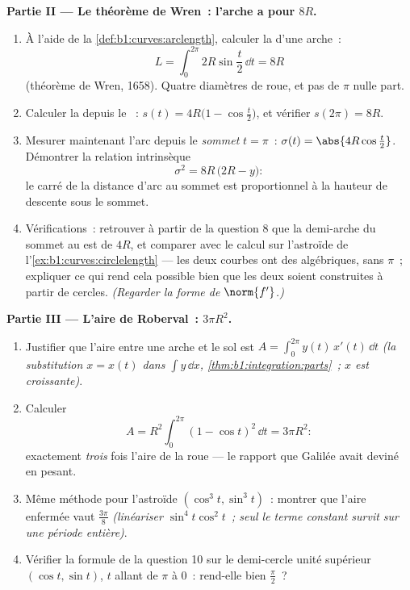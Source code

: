 \begin{problem}
\medskip
\noindent\textbf{Partie II --- Le théorème de Wren~: l'arche a pour 
$8R$.}
\begin{enumerate}[resume]
  \item À l'aide de la \cref{def:b1:curves:arclength}, calculer la 
        d'une arche~:
        \[
        L = \int_0^{2\pi} 2R\sin\frac t2\,\dd t = 8R
        \]
        (théorème de Wren, 1658). Quatre diamètres de roue, et pas de
        $\pi$ nulle part.
  \item Calculer la  depuis le ~: $s(t) =
        4R\bigl(1 - \cos\frac t2\bigr)$, et vérifier $s(2\pi) =
        8R$.
  \item Mesurer maintenant l'arc depuis le \emph{sommet} $t = \pi$~:
        $\sigma(t) = \abs{4R\cos\frac t2}$. Démontrer la relation
        intrinsèque
        \[
        \sigma^2 = 8R\,\bigl(2R - y\bigr) :
        \]
        le carré de la distance d'arc au sommet est proportionnel à
        la hauteur de descente sous le sommet.
  \item Vérifications~: retrouver à partir de la question 8 que la demi-arche
        du sommet au  est de  $4R$, et comparer avec le
        calcul sur l'astroïde de l'\cref{ex:b1:curves:circlelength}
        --- les deux courbes ont des  algébriques, sans $\pi$~;
        expliquer ce qui rend cela possible bien que les deux soient
        construites à partir de cercles. \emph{(Regarder la forme de
        $\norm{f'}$.)}
\end{enumerate}

\medskip
\noindent\textbf{Partie III --- L'aire de Roberval~: $3\pi R^2$.}
\begin{enumerate}[resume]
  \item Justifier que l'aire entre une arche et le sol est
        $A = \int_0^{2\pi} y(t)\,x'(t)\,\dd t$ \emph{(la
        substitution $x = x(t)$ dans $\int y\,\dd x$,
        \cref{thm:b1:integration:parts}~; $x$ est croissante)}.
  \item Calculer
        \[
        A = R^2\int_0^{2\pi}(1 - \cos t)^2\,\dd t = 3\pi R^2 :
        \]
        exactement \emph{trois} fois l'aire de la roue ---
        le rapport que Galilée avait deviné en pesant.
  \item Même méthode pour l'astroïde $(\cos^3t, \sin^3t)$~: montrer
        que l'aire enfermée vaut $\frac{3\pi}8$
        \emph{(linéariser $\sin^4 t\cos^2 t$~; seul le terme
        constant survit sur une période entière)}.
  \item Vérifier la formule de la question 10 sur le demi-cercle unité
        supérieur $(\cos t, \sin t)$, $t$ allant de $\pi$ à $0$~:
        rend-elle bien $\frac\pi2$~?
\end{enumerate}


\end{problem}

